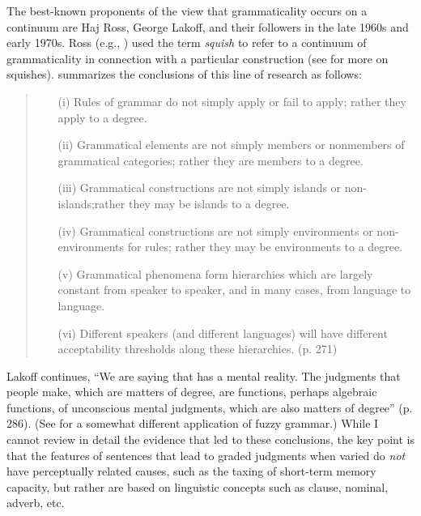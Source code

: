 The  best-known proponents of the view that grammaticality occurs on a continuum are Haj Ross, George Lakoff, and their followers in the late 1960s and early 1970s. Ross (e.g., \citeyear{Ross1972}) used the term \textit{squish} to refer to a continuum of grammaticality in connection with a particular construction (see \citet{HindleEtAl1975} for more on squishes). \citet{Lakoff1973} summarizes the conclusions of this line of research as follows:

\begin{quote} 
\begin{itemize}
\item[(i)] Rules of grammar do not simply apply or fail to apply; rather they apply to a degree.
 
\item[(ii)] Grammatical elements are not simply members or nonmembers of grammatical categories; rather they are members to a degree.

\item[(iii)] Grammatical constructions are not simply islands or non-is\-lands;\linebreak rather they may be islands to a degree.

\item[(iv)] Grammatical constructions are not simply environments or non-envi\-ron\-ments for rules; rather they may be environments to a degree.

\item[(v)] Grammatical phenomena form hierarchies which are largely constant from speaker to speaker, and in many cases, from language to language.

\item[(vi)] Different speakers (and different languages) will have different acceptability thresholds along these hierarchies.  (p. 271)

\end{itemize}
\end{quote}

\noindent
Lakoff continues, ``We are saying that  has a mental reality. The judgments that people make, which are matters of degree, are functions, perhaps algebraic functions, of unconscious mental judgments, which are also matters of degree'' (p. 286). (See \citet{LeveltEtAl1977} for a somewhat different application of fuzzy grammar.) While I cannot review in detail the evidence that led to these conclusions, the key point is that the features of sentences that lead to graded judgments when varied do \textit{not} have perceptually related causes, such as the taxing of short-term memory capacity, but rather are based on linguistic concepts such as clause, nominal, adverb, etc.

